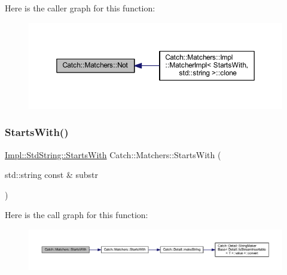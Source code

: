 Here is the caller graph for this function\+:\nopagebreak
\begin{figure}[H]
\begin{center}
\leavevmode
\includegraphics[width=350pt]{namespace_catch_1_1_matchers_ae3c192dc15c973c38f07376d4debdc34_icgraph}
\end{center}
\end{figure}
\hypertarget{namespace_catch_1_1_matchers_a9b6a7704df7d0717dc6686fd2055ffea}{}\label{namespace_catch_1_1_matchers_a9b6a7704df7d0717dc6686fd2055ffea} 
\subsubsection{\texorpdfstring{Starts\+With()}{StartsWith()}\hspace{0.1cm}{\footnotesize\ttfamily [1/2]}}
{\footnotesize\ttfamily \hyperlink{struct_catch_1_1_matchers_1_1_impl_1_1_std_string_1_1_starts_with}{Impl\+::\+Std\+String\+::\+Starts\+With} Catch\+::\+Matchers\+::\+Starts\+With (\begin{DoxyParamCaption}\item[{std\+::string const \&}]{substr }\end{DoxyParamCaption})\hspace{0.3cm}{\ttfamily [inline]}}

Here is the call graph for this function\+:\nopagebreak
\begin{figure}[H]
\begin{center}
\leavevmode
\includegraphics[width=350pt]{namespace_catch_1_1_matchers_a9b6a7704df7d0717dc6686fd2055ffea_cgraph}
\end{center}
\end{figure}
\hypertarget{namespace_catch_1_1_matchers_a031985c11b8c8bb62585b3904f9fd2b0}{}\label{namespace_catch_1_1_matchers_a031985c11b8c8bb62585b3904f9fd2b0} 
